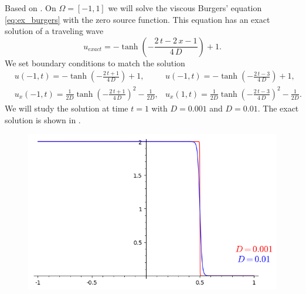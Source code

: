 \begin{example}
\label{ex:burgers_hest}
Based on \cite[Section 7.1.2, Example 7.5,  p. 255]{Hesthaven2008}.
On $\Omega = [-1, 1]$ we will solve the viscous Burgers’ equation
\eqref{eq:ex_burgers} with the zero source function.
This equation has an exact solution of a traveling wave
\begin{equation}
	u_{exact} =  -\tanh\left(-\frac{2 \, t - 2 \, x - 1}{4 \,D}\right) + 1.
\end{equation}
We set boundary conditions to match the solution
\begin{equation}
	\begin{aligned}
	& u(-1, t) = -\tanh\left(-\frac{2 \, t  + 1}{4 \,D}\right) + 1,
	&  u(-1, t) = -\tanh\left(-\frac{2 \, t - 3}{4 \,D}\right) + 1,\\
	&u_x(-1, t) = \frac{1}{2D}\tanh\left(-\frac{2 \, t + 1}{4 \, D}\right)^{2} -
	\frac{1}{2D},
	&u_x(1, t) = \frac{1}{2D}\tanh\left(-\frac{2 \, t - 3}{4 \, D}\right)^{2} -
	\frac{1}{2D}.
	\end{aligned}
\end{equation}
We will study the solution at time $t = 1$ with $D = 0.001$ and $D = 0.01$. The exact
solution is shown in .
\begin{figure}[h]
	\centering
%
	\includegraphics[scale=0.45]{../figs/burgers_hesthaven_exact_t1.png}

\end{figure}
\end{example}
